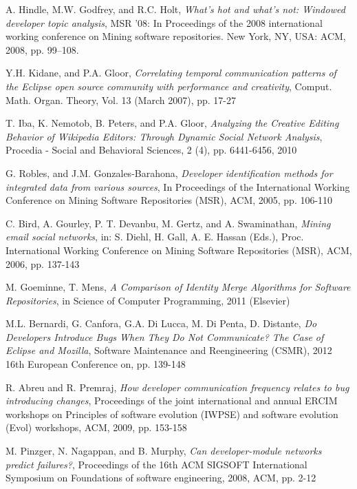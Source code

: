 \documentclass[conference]{IEEEtran}
\begin{document}
\begin{thebibliography}{2}
A. Hindle, M.W. Godfrey, and R.C. Holt, \emph{What's hot and what's not: Windowed developer topic analysis}, MSR ’08: In Proceedings of the 2008 international working conference on Mining software repositories. New York, NY, USA: ACM, 2008, pp. 99–108.


Y.H. Kidane, and P.A. Gloor, \emph{Correlating temporal communication patterns of the Eclipse open source community with performance and creativity}, Comput. Math. Organ. Theory, Vol. 13 (March 2007), pp. 17-27

T. Iba, K. Nemotob, B. Peters, and P.A. Gloor, \emph{Analyzing the Creative Editing Behavior of Wikipedia Editors: Through Dynamic Social Network Analysis}, Procedia - Social and Behavioral Sciences, 2 (4), pp. 6441-6456, 2010

G. Robles, and J.M. Gonzales-Barahona, \emph{Developer identification methods for integrated data from various sources}, In Proceedings of the International Working Conference on Mining Software Repositories (MSR), ACM, 2005, pp. 106-110

C. Bird, A. Gourley, P. T. Devanbu, M. Gertz, and A. Swaminathan, \emph{Mining email social networks},  in: S. Diehl, H. Gall, A. E. Hassan (Eds.), Proc. International Working Conference on Mining Software Repositories (MSR), ACM, 2006, pp. 137-143

M. Goeminne, T. Mens, \emph{A Comparison of Identity Merge Algorithms for Software Repositories}, in Science of Computer Programming, 2011 (Elsevier)

M.L. Bernardi, G. Canfora, G.A. Di Lucca, M. Di Penta, D. Distante, \emph{Do Developers Introduce Bugs When They Do Not Communicate? The Case of Eclipse and Mozilla}, Software Maintenance and Reengineering (CSMR), 2012 16th European Conference on, pp. 139-148

R. Abreu and R. Premraj, \emph{How developer communication frequency relates to bug introducing changes}, Proceedings of the joint international and annual ERCIM workshops on Principles of software evolution (IWPSE) and software evolution (Evol) workshops, ACM, 2009, pp. 153-158

M. Pinzger, N. Nagappan, and B. Murphy, \emph{Can developer-module networks predict failures?}, Proceedings of the 16th ACM SIGSOFT International Symposium on Foundations of software engineering, 2008, ACM, pp. 2-12


\end{thebibliography}
\end{document}
